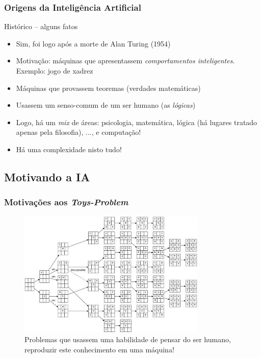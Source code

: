 \documentclass{beamer}
\begin{document}
\begin{frame}[fragile]
\frametitle{Origens da Inteligência Artificial}

\begin{block}{Histórico  -- alguns fatos}
  \begin{itemize}
   \item Sim, foi logo após a morte de Alan Turing (1954)

    \item Motivação: máquinas que apresentassem \emph{comportamentos  inteligentes}. Exemplo: jogo de xadrez
\pause

    \item Máquinas que provassem teoremas (verdades matemáticas)


  \item Usassem um senso-comum de um ser humano (as \textit{lógicas})
\pause

    \item Logo, há um \textit{mix} de áreas: psicologia, matemática, lógica (há lugares tratado apenas pela filosofia), ..., e computação!
\pause    
        \item Há uma complexidade nisto tudo! 
    \end{itemize}
  
\end{block}

\end{frame}


\subsection{Motivando a IA}
\begin{frame}

\frametitle{Motivações aos \textit{Toys-Problem}}

\begin{figure}[ht!]
 \centering
 \includegraphics[width=0.8\textwidth , height=0.67\textheight]{figures/tic_tac_toe.jpg}

\caption{Problemas que usassem uma habilidade de pensar do ser humano, reproduzir este conhecimento em uma máquina!}

\end{figure}


\end{frame}
\end{document}
